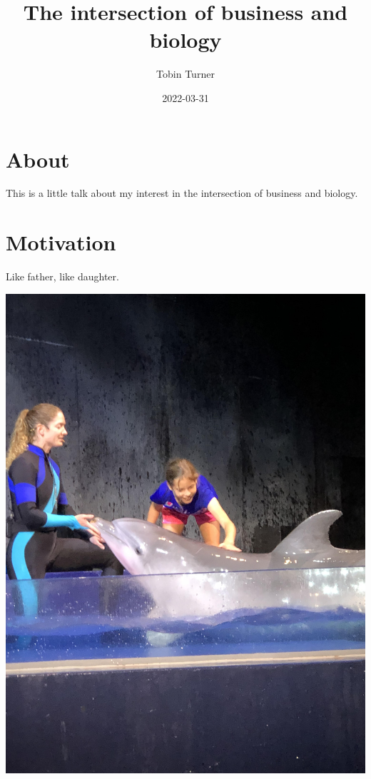 \documentclass[
]{book}
\title{The intersection of business and biology}
\author{Tobin Turner}
\date{2022-03-31}
\begin{document}
\maketitle

{
\setcounter{tocdepth}{1}
\tableofcontents
}
\hypertarget{about}{%
\chapter{About}\label{about}}

This is a little talk about my interest in the intersection of business and biology.

\hypertarget{motivation}{%
\chapter{Motivation}\label{motivation}}

Like father, like daughter.

\begin{center}\includegraphics[width=1\linewidth]{_images/meredith} \end{center}
\end{document}

